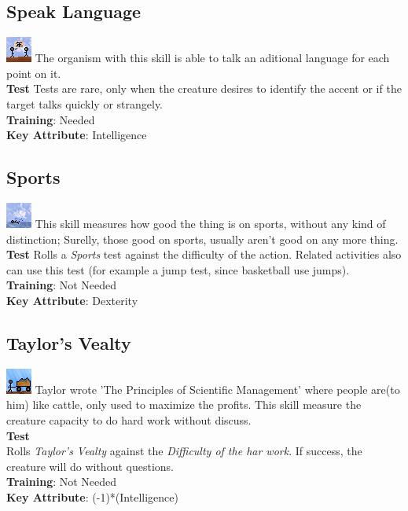 \documentclass[ letterpaper,12pt]{article}
\begin{document}
\subsection{Speak Language}
\includegraphics{../data/skills/Img/falaridioma.png}
The organism with this skill is able to talk an aditional language for each point on it.\\
{\bf Test}
Tests are rare, only when the creature desires to identify the accent or if the target talks quickly or strangely.\\
{\bf Training}: Needed\\
{\bf Key Attribute}: Intelligence\\

\subsection{Sports}
\includegraphics{../data/skills/Img/nadar.png}
This skill measures how good the thing is on sports, without any kind of distinction; Surelly, those good on sports, usually aren't good on any more thing.\\
{\bf Test}
Rolls a {\it Sports} test against the difficulty of the action. Related activities also can use this test (for example a jump test, since basketball use jumps).\\
{\bf Training}: Not Needed\\
{\bf Key Attribute}: Dexterity

\subsection{Taylor's Vealty}
\includegraphics{../data/skills/Img/bovinice.png}
Taylor wrote 'The Principles of Scientific Management' where people are(to him) like cattle, only used to maximize the profits. This skill measure the creature capacity to do hard work without discuss.\\
{\bf Test}\\
Rolls {\it Taylor's Vealty} against the {\it Difficulty of the har work}. If success, the creature will do without questions.\\
{\bf Training}: Not Needed\\
{\bf Key Attribute}: (-1)*(Intelligence) 
\end{document}

